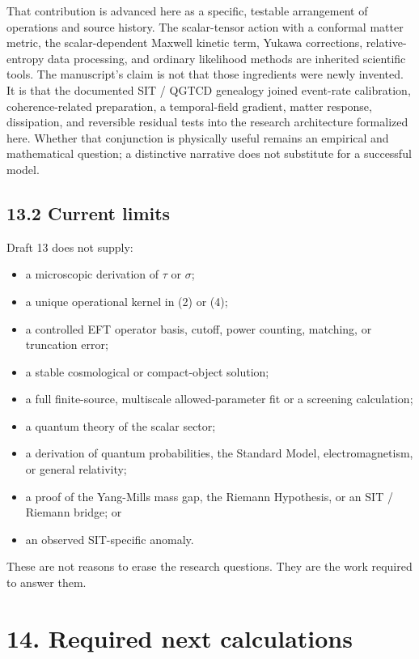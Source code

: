 \documentclass[
  american,
  11pt,
  letterpaper,
]{article}
\providecommand{\tightlist}{%
  \setlength{\itemsep}{0pt}\setlength{\parskip}{0pt}}
\begin{document}
That contribution is advanced here as a specific, testable arrangement of operations and source history. The scalar-tensor action with a conformal matter metric, the scalar-dependent Maxwell kinetic term, Yukawa corrections, relative-entropy data processing, and ordinary likelihood methods are inherited scientific tools. The manuscript's claim is not that those ingredients were newly invented. It is that the documented SIT / QGTCD genealogy joined event-rate calibration, coherence-related preparation, a temporal-field gradient, matter response, dissipation, and reversible residual tests into the research architecture formalized here. Whether that conjunction is physically useful remains an empirical and mathematical question; a distinctive narrative does not substitute for a successful model.

\subsection{13.2 Current limits}\label{current-limits}

Draft 13 does not supply:

\begin{itemize}
\tightlist
\item
  a microscopic derivation of \(\tau\) or \(\sigma\);
\item
  a unique operational kernel in (2) or (4);
\item
  a controlled EFT operator basis, cutoff, power counting, matching, or truncation error;
\item
  a stable cosmological or compact-object solution;
\item
  a full finite-source, multiscale allowed-parameter fit or a screening calculation;
\item
  a quantum theory of the scalar sector;
\item
  a derivation of quantum probabilities, the Standard Model, electromagnetism, or general relativity;
\item
  a proof of the Yang-Mills mass gap, the Riemann Hypothesis, or an SIT / Riemann bridge; or
\item
  an observed SIT-specific anomaly.
\end{itemize}

These are not reasons to erase the research questions. They are the work required to answer them.

\section{14. Required next calculations}\label{required-next-calculations}
\end{document}
